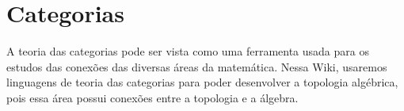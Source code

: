 \section{Categorias}
\label{categorias}


A teoria das categorias pode ser vista como uma ferramenta usada para os estudos das conexões das diversas áreas da matemática. Nessa Wiki, usaremos linguagens de teoria das categorias para poder desenvolver a topologia algébrica, pois essa área possui conexões entre a topologia e a álgebra.


 












